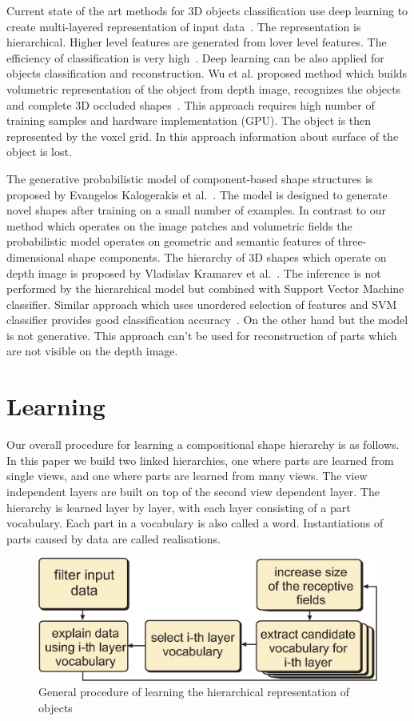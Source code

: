 \documentclass[letterpaper,10pt,conference]{ieeeconf}  %
\begin{document}
Current state of the art methods for 3D objects classification use deep learning to create multi-layered representation of input data~\cite{Deng2014}. The representation is hierarchical. Higher level features are generated from lover level features. The efficiency of classification is very high~\cite{Krizhevsky2012, Socher2012}. Deep learning can be also applied for objects classification and reconstruction. Wu et al. proposed method which builds volumetric representation of the object from depth image, recognizes the objects and complete 3D occluded shapes~\cite{Wu2015}. This approach requires high number of training samples and hardware implementation (GPU). The object is then represented by the voxel grid. In this approach information about surface of the object is lost.

The generative probabilistic model of component-based shape structures is proposed by Evangelos Kalogerakis et al.~\cite{Kalogerakis2012}. The model is designed to generate novel shapes after training on a small number of examples. In contrast to our method which operates on the image patches and volumetric fields the probabilistic model operates on geometric and semantic features of three-dimensional shape components. The hierarchy of 3D shapes which operate on depth image is proposed by Vladislav Kramarev et al.~\cite{Kramarev2015}. The inference is not performed by the hierarchical model but combined with Support Vector Machine classifier. Similar approach which uses unordered selection of features and SVM classifier provides good classification accuracy~\cite{Toldo2010}. On the other hand but the model is not generative. This approach can't be used for reconstruction of parts which are not visible on the depth image.

\section{Learning}

Our overall procedure for learning a compositional shape hierarchy is as follows. In this paper we build two linked hierarchies, one where parts are learned from single views, and one where parts are learned from many views. The view independent layers are built on top of the second view dependent layer. The hierarchy is learned layer by layer, with each layer consisting of a part vocabulary. Each part in a vocabulary is also called a word. Instantiations of parts caused by data are called realisations. 

\begin{figure}[t]
 \centering
\includegraphics[width=0.9\columnwidth]{../images/learningGeneral.eps}
\caption{General procedure of learning the hierarchical representation of objects}
 \label{hopProc}
\end{figure}
\end{document}

